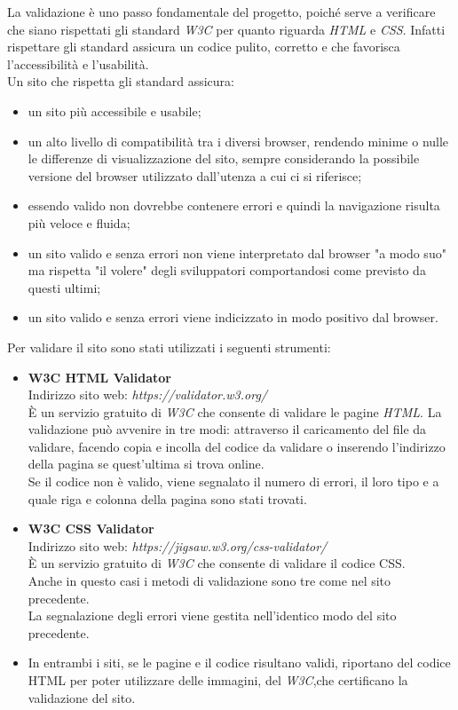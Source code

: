 La validazione è uno passo fondamentale del progetto, poiché serve a verificare che siano rispettati gli standard \emph{W3C} per quanto riguarda \emph{HTML} e \emph{CSS}. Infatti rispettare gli standard assicura un codice pulito, corretto e che favorisca l'accessibilità e l'usabilità.\\
Un sito che rispetta gli standard assicura:
\begin{itemize}
	\item un sito più accessibile e usabile;
	\item un alto livello di compatibilità tra i diversi browser, rendendo minime o nulle le differenze di visualizzazione del sito, sempre considerando la possibile versione del browser utilizzato dall'utenza a cui ci si riferisce;
	\item essendo valido non dovrebbe contenere errori e quindi la navigazione risulta più veloce e fluida;
	\item un sito valido e senza errori non viene interpretato dal browser "a modo suo" ma rispetta "il volere" degli sviluppatori comportandosi come previsto da questi ultimi; %
	\item un sito valido e senza errori viene indicizzato in modo positivo dal browser.  %
\end{itemize}
Per validare il sito sono stati utilizzati i seguenti strumenti:
\begin{itemize}
	\item \textbf{W3C HTML Validator}\\
	Indirizzo sito web: \emph{https://validator.w3.org/}\\
	È un servizio gratuito di \emph{W3C} che consente di validare le pagine \emph{HTML}. La validazione può avvenire in tre modi: attraverso il caricamento del file da validare, facendo copia e incolla del codice da validare o inserendo l'indirizzo della pagina se quest'ultima si trova online.\\
Se il codice non è valido, viene segnalato il numero di errori, il loro tipo e a quale riga e colonna della pagina sono stati trovati.
	\item \textbf{W3C CSS Validator}\\
	Indirizzo sito web: \emph{https://jigsaw.w3.org/css-validator/}\\
	È un servizio gratuito di \emph{W3C} che consente di validare il codice CSS.\\
	Anche in questo casi i metodi di validazione sono tre come nel sito precedente.\\
	La segnalazione degli errori viene gestita nell'identico modo del sito precedente.\\
	 \item In entrambi i siti, se le pagine e il codice risultano validi, riportano del codice HTML per poter utilizzare delle immagini, del \emph{W3C},che certificano la validazione del sito.
\end{itemize}